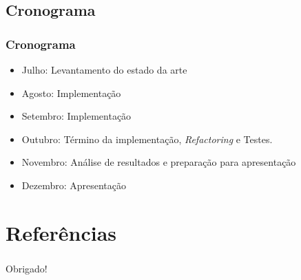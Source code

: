 \documentclass{beamer}
\begin{document}
\subsection{Cronograma}
\begin{frame}
    \frametitle{Cronograma}
    \begin{itemize}
        \item Julho: Levantamento do estado da arte
        \item Agosto: Implementação
        \item Setembro: Implementação
        \item Outubro: Término da implementação, \textit{Refactoring} e Testes.
        \item Novembro: Análise de resultados e preparação para apresentação
        \item Dezembro: Apresentação
    \end{itemize}
\end{frame}



\nocite{fabriciobuzzeto,weiser2,saocarlos,yang,hewitt,violajones}

\section{Referências}


\begin{frame}
    \frametitle{ }
    \centerline{Obrigado!}
\end{frame}
\end{document}
